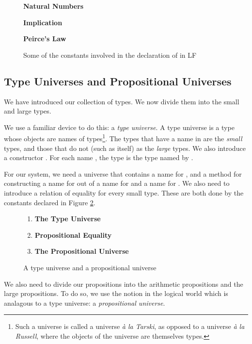 \documentclass[acmtocl]{acmtrans2m}
\newcommand{\LF}{LF}
\begin{document}
\begin{figure}[top]
\textbf{Natural Numbers}

\textbf{Implication}

\textbf{Peirce's Law}

\caption{Some of the constants involved in the declaration of  in \LF} \label{fig:ltt}
\end{figure}


\subsection{Type Universes and Propositional Universes}

We have introduced our collection of types.  We now divide them into
the small and large types.

We use a familiar device to do this: a \emph{type universe}. A type universe 
is a type whose objects are names of types\footnote{Such a universe is called a universe \emph{\`a la Tarski}, as opposed to a universe \emph{\`a la Russell}, where the objects of the universe are themselves types.}.  The types that have a name in  are the
\emph{small} types, and those that do not (such as  itself) as the
\emph{large} types. We also introduce a constructor .
For each name , the type  is the type named by .

For our system, we need a
universe  that contains a name for , and a method for
constructing a name for  out of a name for  and a
name for .  We also need to introduce a relation of equality for every small type.  These are both done by the constants declared in Figure \ref{fig:univs}.

\begin{figure}[top]
\begin{enumerate}
 \item \textbf{The Type Universe}

\item
\textbf{Propositional Equality}

\item
\textbf{The Propositional Universe}

\end{enumerate}
\caption{A type universe and a propositional universe}
\label{fig:univs}
\end{figure}

We also need to divide our propositions into the arithmetic propositions
and the large propositions.  To do so, we use the notion
in the logical world which is analagous to a type universe: a \emph{propositional
universe}.
\end{document}
